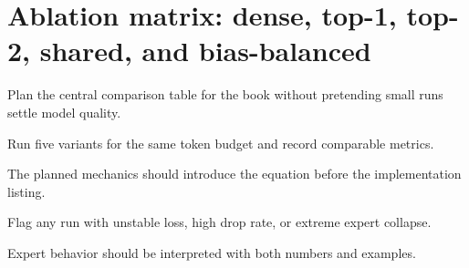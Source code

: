 \section{Ablation matrix: dense, top-1, top-2, shared, and bias-balanced}
\label{sec:ch11-ablation-matrix-dense-top-1-top-2-shared-and-bias-balanced}

Plan the central comparison table for the book without pretending small runs settle model quality.



Run five variants for the same token budget and record comparable metrics.



The planned mechanics should introduce the equation before the implementation listing.





\begin{checkpointbox}
Flag any run with unstable loss, high drop rate, or extreme expert collapse.
\end{checkpointbox}

Expert behavior should be interpreted with both numbers and examples.
